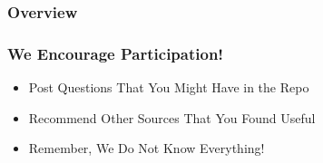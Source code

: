 
\begin{frame}[plain]
\titlepage
\end{frame}
\note{}

\begin{frame}
\frametitle{\large{Overview}}
\tableofcontents
\end{frame}
\note{}

\begin{frame}
\frametitle{\large{We Encourage Participation!}}
\begin{itemize}
\item Post Questions That You Might Have in the Repo
\item Recommend Other Sources That You Found Useful
\item Remember, We Do Not Know Everything!
\end{itemize}
\end{frame}
\note{}